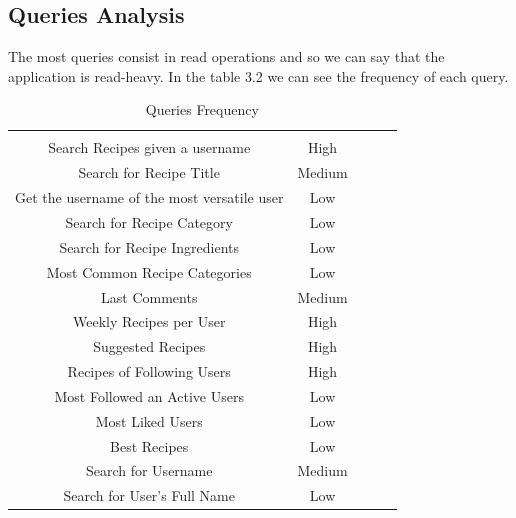 \documentclass[a4paper]{report}
\begin{document}
\subsection{Queries Analysis}
The most queries consist in read operations and so we can say that the application is read-heavy. In the table 3.2 we can see the frequency of each query. 

\begin{table}[htpb]
	\centering
	\caption{Queries Frequency}
	\begin{tabular}{|c|c|lll}
		\cline{1-2}
		\cellcolor[HTML]{000000}{\color[HTML]{FFFFFF} Query} &
		\cellcolor[HTML]{000000}{\color[HTML]{FFFFFF} Frequency} &
		\multicolumn{1}{c}{\cellcolor[HTML]{FFFFFF}{\color[HTML]{FFFFFF} }} &
		&
		\\ \cline{1-2}
		Search Recipes given a username             & High   & \cellcolor[HTML]{FFFFFF} &  &  \\ \cline{1-2}
		Search for Recipe Title                     & Medium & \cellcolor[HTML]{FFFFFF} &  &  \\ \cline{1-2}
		Get the username of the most versatile user & Low    &                          &  &  \\ \cline{1-2}
		Search for Recipe Category                  & Low    &                          &  &  \\ \cline{1-2}
		Search for Recipe Ingredients               & Low    &                          &  &  \\ \cline{1-2}
		Most Common Recipe Categories               & Low    &                          &  &  \\ \cline{1-2}
		Last Comments                               & Medium &                          &  &  \\ \cline{1-2}
		Weekly Recipes per User                     & High   &                          &  &  \\ \cline{1-2}
		Suggested Recipes                           & High   &                          &  &  \\ \cline{1-2}
		Recipes of Following Users                  & High   &                          &  &  \\ \cline{1-2}
		Most Followed an Active Users               & Low    &                          &  &  \\ \cline{1-2}
		Most Liked Users                            & Low    &                          &  &  \\ \cline{1-2}
		Best Recipes                                & Low    &                          &  &  \\ \cline{1-2}
		Search for Username                         & Medium &                          &  &  \\ \cline{1-2}
		Search for User's Full Name                 & Low    &                          &  &  \\ \cline{1-2}
	\end{tabular}
\end{table}
\end{document}
